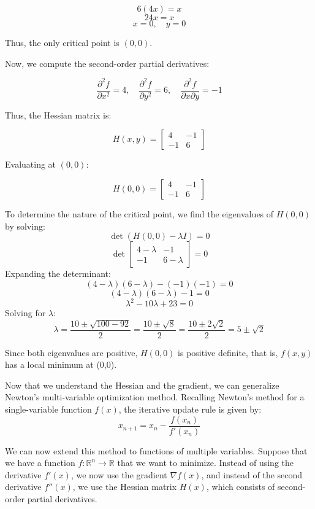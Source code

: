 \documentclass[12pt]{article}
\theoremstyle{definition}
\begin{document}
\[
6(4x) = x
\]
\[
24x = x
\]
\[
x = 0, \quad y = 0
\]

Thus, the only critical point is \( (0,0) \).

Now, we compute the second-order partial derivatives:

\[
\frac{\partial^2 f}{\partial x^2} = 4, \quad \frac{\partial^2 f}{\partial y^2} = 6, \quad \frac{\partial^2 f}{\partial x \partial y} = -1
\]

Thus, the Hessian matrix is:

\[
H(x,y) =
\begin{bmatrix}
4 & -1 \\
-1 & 6
\end{bmatrix}
\]

Evaluating at \( (0,0) \):

\[
H(0,0) =
\begin{bmatrix}
4 & -1 \\
-1 & 6
\end{bmatrix}
\]

To determine the nature of the critical point, we find the eigenvalues of \( H(0,0) \) by solving:
\[
\det \left( H(0,0) - \lambda I \right) = 0
\]
\[
\det \begin{bmatrix} 4 - \lambda & -1 \\ -1 & 6 - \lambda \end{bmatrix} = 0
\]
Expanding the determinant:
\[
(4 - \lambda)(6 - \lambda) - (-1)(-1) = 0
\]
\[
(4 - \lambda)(6 - \lambda) - 1 = 0
\]
\[
\lambda^2 - 10\lambda + 23 = 0
\]
Solving for \( \lambda \):
\[
\lambda = \frac{10 \pm \sqrt{100 - 92}}{2} = \frac{10 \pm \sqrt{8}}{2} = \frac{10 \pm 2\sqrt{2}}{2} = 5 \pm \sqrt{2}
\]

Since both eigenvalues are positive, \( H(0,0) \) is positive definite, that is, \( f(x,y) \) has a local minimum at (0,0).

Now that we understand the Hessian and the gradient, we can generalize Newton's multi-variable optimization method. Recalling Newton's method for a single-variable function \( f(x) \), the iterative update rule is given by:
\[
x_{n+1} = x_n - \frac{f(x_n)}{f'(x_n)}
\]

We can now extend this method to functions of multiple variables. Suppose that we have a function \( f: \mathbb{R}^n \to \mathbb{R} \) that we want to minimize. Instead of using the derivative \( f'(x) \), we now use the gradient \( \nabla f(x) \), and instead of the second derivative \( f''(x) \), we use the Hessian matrix \( H(x) \), which consists of second-order partial derivatives.
\end{document}
